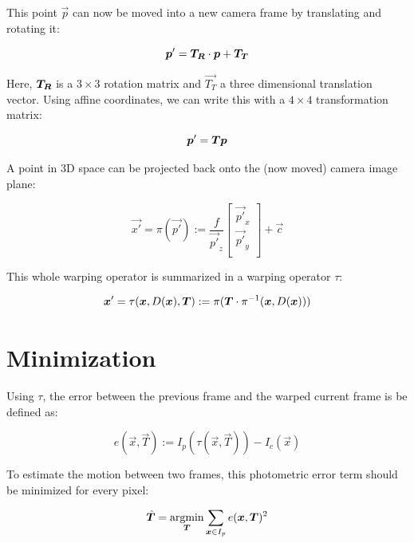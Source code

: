 This point $\vec{p}$ can now be moved into a new camera frame by translating and rotating it:

\begin{equation}
    \vec{p'} = \mat{T_R} \cdot \vec{p} + \vec{T_T}
\end{equation}

Here, $\mat{T_R}$ is a $3 \times 3$ rotation matrix and $\vec{T_T}$ a three dimensional translation
vector. Using affine coordinates, we can write this with a $4 \times 4$ transformation matrix:

\begin{equation}
    \vec{p'} = \mat{T} \vec{p}
\end{equation}

A point in 3D space can be projected back onto the (now moved) camera image plane:

\begin{equation}
    \label{eq:projection}
    \vec{x'} = \pi(\vec{p'}) := \frac{f}{\vec{p'}_z}
    \begin{bmatrix}
        \vec{p'}_x \\
        \vec{p'}_y \\
    \end{bmatrix}
    + \vec{c}
\end{equation}

This whole warping operator is summarized in a warping operator $\tau$:

\begin{equation}
    \vec{x'} = \tau(\vec{x}, D(\vec{x}), \vec{T}) := \pi( \mat{T} \cdot \pi^{-1} (\vec{x}, D(\vec{x})))
\end{equation}



\section{Minimization}

Using $\tau$, the error between the previous frame and the warped current frame is be defined as:

\begin{equation}
    \label{eq:error}
    e(\vec{x}, \vec{T}) := I_p(\tau(\vec{x}, \vec{T})) - I_c(\vec{x})
\end{equation}


To estimate the motion between two frames, this photometric error term should
be minimized for every pixel:

\begin{equation}
    \vec{\hat{T}} = \operatornamewithlimits{argmin}_{\vec{T}} \sum_{\vec{x} \in I_p} e(\vec{x}, \vec{T})^2
\end{equation}


